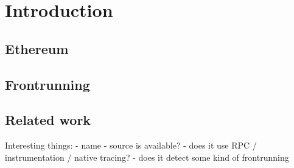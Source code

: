 \documentclass[draft,final]{vutinfth} %
\begin{document}
\frontmatter %

\addstatementpage

\begin{danksagung*}
\end{danksagung*}

\begin{acknowledgements*}
\end{acknowledgements*}

\begin{kurzfassung}
\end{kurzfassung}

\begin{abstract}
\end{abstract}


\tableofcontents %

\mainmatter

\chapter{Introduction}

\section{Ethereum}

\section{Frontrunning}

\section{Related work}

Interesting things:
- name
- source is available?
- does it use RPC / instrumentation / native tracing?
- does it detect some kind of frontrunning
\end{document}
